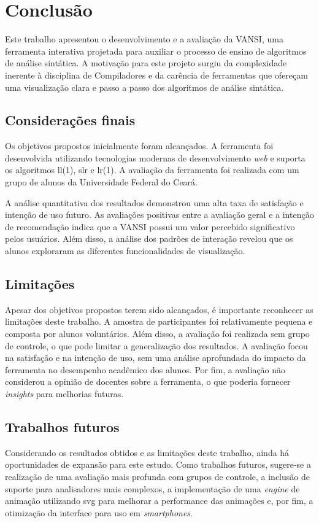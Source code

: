 \chapter{Conclusão}
\label{chap:conclusao}

Este trabalho apresentou o desenvolvimento e a avaliação da VANSI, uma ferramenta interativa projetada para auxiliar o processo de ensino de algoritmos de análise sintática. A motivação para este projeto surgiu da complexidade inerente à disciplina de Compiladores e da carência de ferramentas que ofereçam uma visualização clara e passo a passo dos algoritmos de análise sintática.

\section{Considerações finais}

Os objetivos propostos inicialmente foram alcançados. A ferramenta foi desenvolvida utilizando tecnologias modernas de desenvolvimento \textit{web} e suporta os algoritmos \gls{ll}(1), \gls{slr} e \gls{lr}(1). A avaliação da ferramenta foi realizada com um grupo de alunos da Universidade Federal do Ceará.

A análise quantitativa dos resultados demonstrou uma alta taxa de satisfação e intenção de uso futuro. As avaliações positivas entre a avaliação geral e a intenção de recomendação indica que a VANSI possui um valor percebido significativo pelos usuários. Além disso, a análise dos padrões de interação revelou que os alunos exploraram as diferentes funcionalidades de visualização.

\section{Limitações}

Apesar dos objetivos propostos terem sido alcançados, é importante reconhecer as limitações deste trabalho. A amostra de participantes foi relativamente pequena e composta por alunos voluntários. Além disso, a avaliação foi realizada sem grupo de controle, o que pode limitar a generalização dos resultados. A avaliação focou na satisfação e na intenção de uso, sem uma análise aprofundada do impacto da ferramenta no desempenho acadêmico dos alunos. Por fim, a avaliação não considerou a opinião de docentes sobre a ferramenta, o que poderia fornecer \textit{insights} para melhorias futuras.

\section{Trabalhos futuros}

Considerando os resultados obtidos e as limitações deste trabalho, ainda há oportunidades de expansão para este estudo. Como trabalhos futuros, sugere-se a realização de uma avaliação mais profunda com grupos de controle, a inclusão de suporte para analisadores mais complexos, a implementação de uma \textit{engine} de animação utilizando \gls{svg} para melhorar a performance das animações e, por fim, a otimização da interface para uso em \textit{smartphones}.